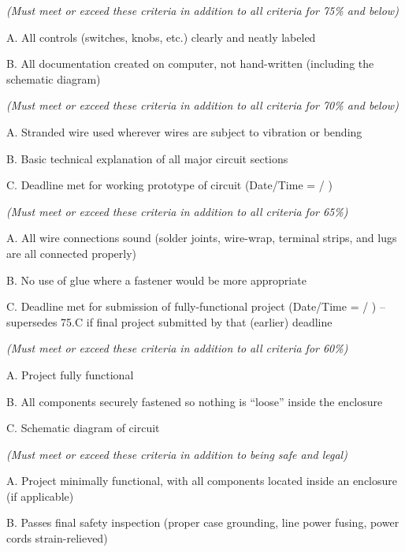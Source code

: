 \goodbreak
\noindent
{} {\it (Must meet or exceed these criteria in addition to all criteria for 75\% and below)}
\item{A.} All controls (switches, knobs, etc.) clearly and neatly labeled
\item{B.} All documentation created on computer, not hand-written (including the schematic diagram)

\vskip 15pt

\goodbreak
\noindent
{} {\it (Must meet or exceed these criteria in addition to all criteria for 70\% and below)}
\item{A.} Stranded wire used wherever wires are subject to vibration or bending
\item{B.} Basic technical explanation of all major circuit sections
\item{C.} Deadline met for working prototype of circuit (Date/Time = \underbar{\hskip 50pt} / \underbar{\hskip 50pt} \hskip 1pt)

\vskip 15pt

\goodbreak
\noindent
{} {\it (Must meet or exceed these criteria in addition to all criteria for 65\%)}
\item{A.} All wire connections sound (solder joints, wire-wrap, terminal strips, and lugs are all connected properly)
\item{B.} No use of glue where a fastener would be more appropriate
\item{C.} Deadline met for submission of fully-functional project (Date/Time = \underbar{\hskip 50pt} / \underbar{\hskip 50pt} \hskip 1pt) -- supersedes 75.C if final project submitted by that (earlier) deadline

\vskip 15pt

\goodbreak
\noindent
{} {\it (Must meet or exceed these criteria in addition to all criteria for 60\%)}
\item{A.} Project fully functional
\item{B.} All components securely fastened so nothing is ``loose'' inside the enclosure
\item{C.} Schematic diagram of circuit

\vskip 15pt

\goodbreak
\noindent
{} {\it (Must meet or exceed these criteria in addition to being safe and legal)}
\item{A.} Project minimally functional, with all components located inside an enclosure (if applicable)
\item{B.} Passes final safety inspection (proper case grounding, line power fusing, power cords strain-relieved)

